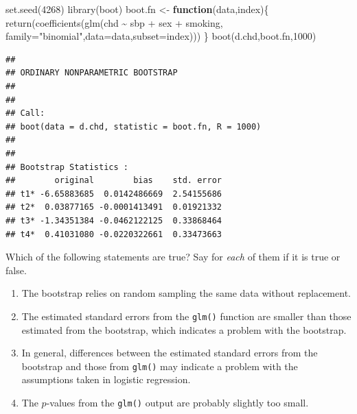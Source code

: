 \documentclass[
]{article}
\newenvironment{Shaded}{\begin{snugshade}}{\end{snugshade}}
\newcommand{\AttributeTok}[1]{\textcolor[rgb]{0.77,0.63,0.00}{#1}}
\newcommand{\ControlFlowTok}[1]{\textcolor[rgb]{0.13,0.29,0.53}{\textbf{#1}}}
\newcommand{\DecValTok}[1]{\textcolor[rgb]{0.00,0.00,0.81}{#1}}
\newcommand{\FunctionTok}[1]{\textcolor[rgb]{0.00,0.00,0.00}{#1}}
\newcommand{\NormalTok}[1]{#1}
\newcommand{\OtherTok}[1]{\textcolor[rgb]{0.56,0.35,0.01}{#1}}
\newcommand{\SpecialCharTok}[1]{\textcolor[rgb]{0.00,0.00,0.00}{#1}}
\newcommand{\StringTok}[1]{\textcolor[rgb]{0.31,0.60,0.02}{#1}}
\providecommand{\tightlist}{%
  \setlength{\itemsep}{0pt}\setlength{\parskip}{0pt}}
\begin{document}
\begin{Shaded}
\begin{Highlighting}[]
\FunctionTok{set.seed}\NormalTok{(}\DecValTok{4268}\NormalTok{)}
\FunctionTok{library}\NormalTok{(boot)}
\NormalTok{boot.fn }\OtherTok{\textless{}{-}} \ControlFlowTok{function}\NormalTok{(data,index)\{}
  \FunctionTok{return}\NormalTok{(}\FunctionTok{coefficients}\NormalTok{(}\FunctionTok{glm}\NormalTok{(chd }\SpecialCharTok{\textasciitilde{}}\NormalTok{ sbp }\SpecialCharTok{+}\NormalTok{ sex }\SpecialCharTok{+}\NormalTok{ smoking, }\AttributeTok{family=}\StringTok{"binomial"}\NormalTok{,}\AttributeTok{data=}\NormalTok{data,}\AttributeTok{subset=}\NormalTok{index)))}
\NormalTok{\}}
\FunctionTok{boot}\NormalTok{(d.chd,boot.fn,}\DecValTok{1000}\NormalTok{)}
\end{Highlighting}
\end{Shaded}

\begin{verbatim}
## 
## ORDINARY NONPARAMETRIC BOOTSTRAP
## 
## 
## Call:
## boot(data = d.chd, statistic = boot.fn, R = 1000)
## 
## 
## Bootstrap Statistics :
##        original        bias    std. error
## t1* -6.65883685  0.0142486669  2.54155686
## t2*  0.03877165 -0.0001413491  0.01921332
## t3* -1.34351384 -0.0462122125  0.33868464
## t4*  0.41031080 -0.0220322661  0.33473663
\end{verbatim}

Which of the following statements are true? Say for \emph{each} of them
if it is true or false.

\begin{enumerate}
\def\labelenumi{(\roman{enumi})}
\tightlist
\item
  The bootstrap relies on random sampling the same data without
  replacement.
\item
  The estimated standard errors from the \texttt{glm()} function are
  smaller than those estimated from the bootstrap, which indicates a
  problem with the bootstrap.
\item
  In general, differences between the estimated standard errors from the
  bootstrap and those from \texttt{glm()} may indicate a problem with
  the assumptions taken in logistic regression.
\item
  The \(p\)-values from the \texttt{glm()} output are probably slightly
  too small.
\end{enumerate}
\end{document}
